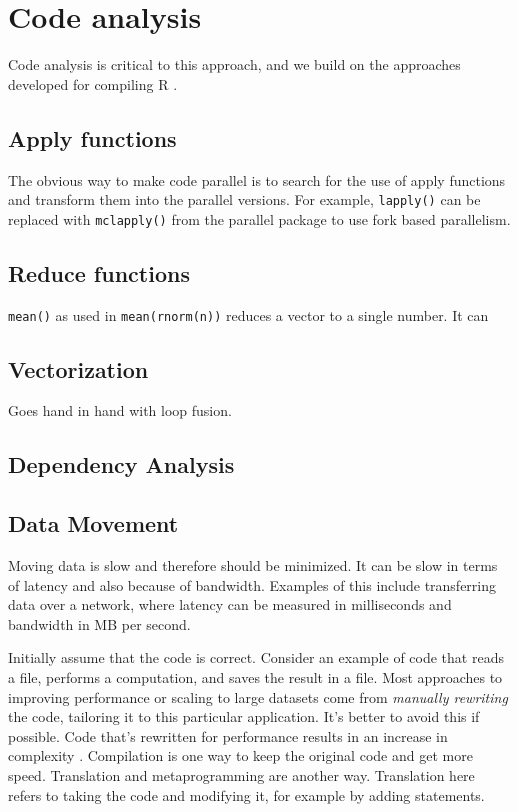 \documentclass[12pt]{article}
\begin{document}
\section{Code analysis}

Code analysis is critical to this approach, and we build on the approaches
developed for compiling R \cite{lang2014enhancing}.

\subsection{Apply functions}

The obvious way to make code parallel is to search for the use of
apply functions and transform them into the parallel versions. For example, 
\texttt{lapply()} can be replaced with \texttt{mclapply()} from the
parallel package to use fork based parallelism.

\subsection{Reduce functions}

\texttt{mean()} as used in \texttt{mean(rnorm(n))} reduces a vector to a
single number. It can 

\subsection{Vectorization}

Goes hand in hand with loop fusion.

\subsection{Dependency Analysis}

\appendix


\newpage
\newpage

\subsection{Data Movement}

Moving data is slow and therefore should be minimized. It can be slow in
terms of latency and also because of bandwidth. Examples of this include
transferring data over a network, where latency can be measured in
milliseconds and bandwidth in MB per second.

Initially assume that the code is correct. Consider an example of code that
reads a file, performs a computation, and saves the result in a file.
Most approaches to improving performance or scaling to large datasets
come from \emph{manually rewriting} the code, tailoring it to this
particular application. It's better to avoid this if possible.  Code that's
rewritten for performance results in an increase in complexity
\cite{matloff2015parallel}.  Compilation is one way to keep the original
code and get more speed. Translation and metaprogramming are another way.
Translation here refers to taking the code and modifying it, for example by
adding statements.
\end{document}

